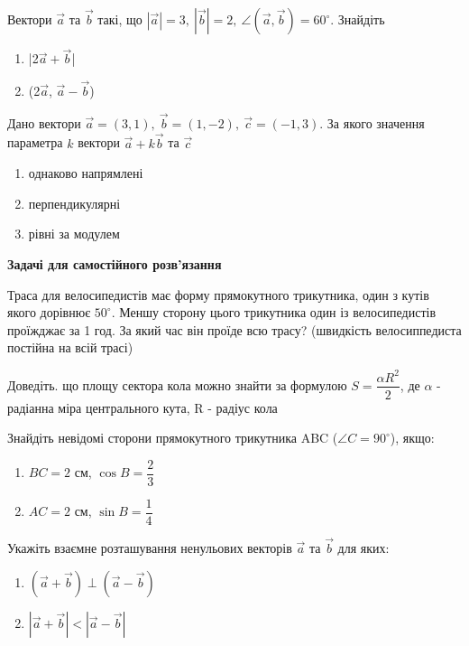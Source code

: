 \begin{problem}{7}
	Вектори $\vec{a}$ та $\vec{b}$ такі, що $|\vec{a}| = 3,~ |\vec{b}| = 2, ~\angle(\vec{a},\vec{b}) = 60^{\circ}$. Знайдіть
	\begin{enumerate}
		\item |2$\vec{a} + \vec{b}$|
		\item (2$\vec{a}$, $\vec{a}-\vec{b}$)
	\end{enumerate}


\end{problem}

\begin{problem}{16}
	Дано вектори $\vec{a} = (3,1), ~\vec{b} = (1,-2),~\vec{c} = (-1,3)$. За якого значення параметра $k$ вектори $\vec{a}+k\vec{b}$ та $\vec{c}$
	\begin{enumerate}
		\item однаково напрямлені
		\item перпендикулярні
		\item рівні за модулем
	\end{enumerate}
\end{problem}

\textbf{Задачі для самостійного розв'язання}
\begin{problem}{8}
	Траса для велосипедистів має форму прямокутного трикутника, один з кутів якого дорівнює $50^{\circ}$. Меншу сторону цього трикутника один із велосипедистів проїжджає за 1 год. За який час він проїде всю трасу? 
	(швидкість велосиппедиста постійна на всій трасі)
\end{problem}

\begin{problem}{9}
	Доведіть. що площу сектора кола можно знайти за формулою $S = \dfrac{\alpha R^2}{2}$, де $\alpha$ - радіанна міра центрального кута, R - радіус кола
\end{problem}
\begin{problem}{10}
	Знайдіть невідомі сторони прямокутного трикутника ABC ($\angle C = 90^{\circ}$), якщо:
	\begin{enumerate}
		\item $BC = 2 $ см, $\cos B = \dfrac{2}{3}$
		\item $AC = 2 $ см, $\sin B = \dfrac{1}{4}$
	\end{enumerate} 
\end{problem}

\begin{problem}{11}
	Укажіть взаємне розташування ненульових векторів $\vec{a}$ та $\vec{b}$ для яких:
	\begin{enumerate}
		\item $(\vec{a}+\vec{b})\perp (\vec{a}-\vec{b})$
		\item $|\vec{a}+\vec{b}|<|\vec{a}-\vec{b}|$
	\end{enumerate}
\end{problem}

